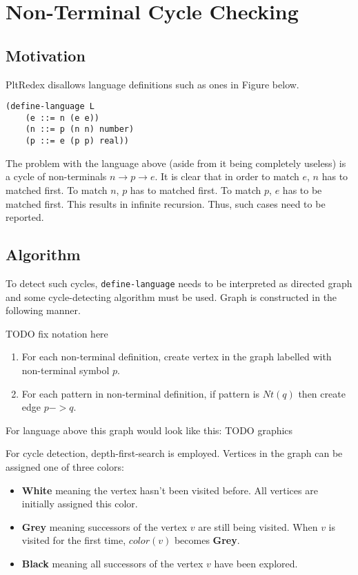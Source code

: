 \section{Non-Terminal Cycle Checking}

\subsection{Motivation}
PltRedex disallows language definitions such as ones in Figure below. 

\begin{lstlisting}
(define-language L
	(e ::= n (e e))
	(n ::= p (n n) number)
	(p ::= e (p p) real))
\end{lstlisting}

The problem with the language above (aside from it being completely useless) is a cycle of non-terminals $n \rightarrow p \rightarrow e$. It is clear that in order to match $e$, $n$ has to matched first. To match $n$, $p$ has to matched first. To match $p$, $e$ has to be matched first. This results in infinite recursion. Thus, such cases need to be reported.

\subsection{Algorithm}
To detect such cycles, \texttt{define-language} needs to be interpreted as directed graph and some cycle-detecting algorithm must be used. Graph is constructed in the following manner.

TODO fix notation here

\begin{enumerate}
\item
For each non-terminal definition, create vertex in the graph labelled with non-terminal symbol $p$.
\item
For each pattern in non-terminal definition, if pattern is $Nt(q)$ then create edge $p->q$.
\end{enumerate}


For language above this graph would look like this:
TODO graphics


For cycle detection, depth-first-search is employed. Vertices in the graph can be assigned one of three colors:

\begin{itemize}
\item

\textbf{White} meaning the vertex hasn't been visited before. All vertices are initially assigned this color.

\item
\textbf{Grey} meaning successors of the vertex $v$ are still being visited. When $v$ is visited for the first time, $color(v)$ becomes \textbf{Grey}.
\item
\textbf{Black} meaning all successors of the vertex $v$ have been explored. 
\end{itemize}




